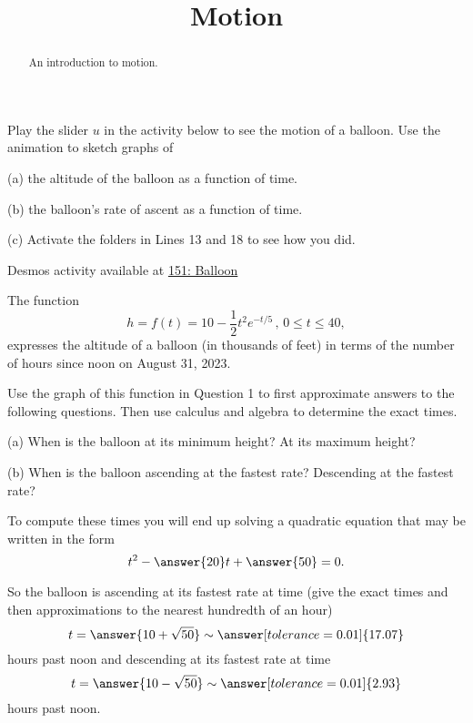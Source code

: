 \documentclass{ximera}
\title{Motion}
\begin{document}
\begin{abstract}
An introduction to motion.
\end{abstract}
\maketitle


\begin{question}  \label{Q:4sdfdsfdellk}

Play the slider $u$ in the activity below to see the motion of a balloon. Use the animation to sketch graphs of

(a) the altitude of the balloon as a function of time.

(b) the balloon's rate of ascent as a function of time.

(c) Activate the folders in Lines 13 and 18 to see how you did.

\begin{onlineOnly}
    \begin{center}
\end{center}
\end{onlineOnly}

Desmos activity available at \href{https://www.desmos.com/calculator/buhgm24hfx}{151: Balloon}

\end{question}


\begin{question}  \label{QDfsdtegg}
The function
\[
     h = f(t) = 10 - \frac{1}{2}t^2 e^{-t/5} \, , \, 0\leq t \leq 40,
\]
expresses the altitude of a balloon (in thousands of feet) in terms of the number of hours since noon on August 31, 2023.

Use the graph of this function in Question 1 to first approximate answers to the following questions. Then use calculus and algebra to determine the exact times.

(a) When is the balloon at its minimum height? At its maximum height?

(b) When is the balloon ascending at the fastest rate? Descending at the fastest rate? 

To compute these times you will end up solving a quadratic equation that may be written in the form
\[
    t^2 - \answer{20}t + \answer{50} = 0.
\]
 
So the balloon is ascending at its fastest rate at time (give the exact times and then approximations to the nearest hundredth of an hour)
\[
    t = \answer{10 + \sqrt{50}} \sim \answer[tolerance=0.01]{17.07}
\]
hours past noon and descending at its fastest rate at time
\[
   t = \answer{10 - \sqrt{50}} \sim \answer[tolerance=0.01]{2.93}
\]
hours past noon.

\end{question}
\end{document}
